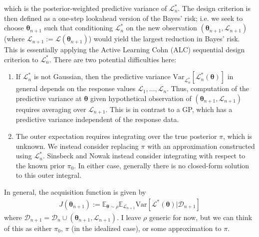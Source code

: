\documentclass[12pt]{article}
\newcommand{\E}{\mathbb{E}}
\newcommand{\Var}{\mathrm{Var}}
\newcommand{\btheta}{\boldsymbol{\theta}}
\begin{document}
which is the posterior-weighted predictive variance of $\mathcal{L}_n^*$. The design criterion is then defined as a one-step lookahead version of the Bayes' risk; i.e. we seek to 
choose $\btheta_{n+1}$ such that conditioning $\mathcal{L}_n^*$ on the new observation $\left(\btheta_{n+1}, \mathcal{L}_{n+1} \right)$ 
(where $\mathcal{L}_{n+1} := \mathcal{L}(\btheta_{n+1})$) would yield the largest reduction in Bayes' risk. This is essentially applying the Active Learning Cohn (ALC) 
sequential design criterion to $\mathcal{L}_n^*$. There are two potential difficulties here: 
\begin{enumerate}
\item If $\mathcal{L}_n^*$ is not Gaussian, then the predictive variance $\Var_{\mathcal{L}_n^*}\left[\mathcal{L}_n^*(\btheta) \right]$ in general depends on the 
response values $\mathcal{L}_1, \dots, \mathcal{L}_n$. Thus, computation of the predictive variance at $\btheta$ given hypothetical observation of 
$\left(\btheta_{n+1}, \mathcal{L}_{n+1} \right)$ requires averaging over $\mathcal{L}_{n+1}$. This is in contrast to a GP, which has a predictive variance independent of 
the response data. 
\item The outer expectation requires integrating over the true posterior $\pi$, which is unknown. We instead consider replacing $\pi$ with an approximation constructed 
using $\mathcal{L}_n^*$. Sinsbeck and Nowak instead consider integrating with respect to the known 
prior $\pi_0$. In either case, generally there is no closed-form solution to this outer integral. 
\end{enumerate}
In general, the acquisition function is given by 
\begin{align}
J(\btheta_{n+1}) := \E_{\btheta \sim \rho} \E_{\mathcal{L}_{n+1}} \Var\left[\mathcal{L}^*(\btheta) | \mathcal{D}_{n+1} \right] \label{acquisition}
\end{align}
where $\mathcal{D}_{n+1} = \mathcal{D}_{n} \cup \left(\btheta_{n+1}, \mathcal{L}_{n+1} \right)$. I leave $\rho$ generic for now, but we can think of this as either 
$\pi_0$, $\pi$ (in the idealized case), or some approximation to $\pi$. 
\end{document}
